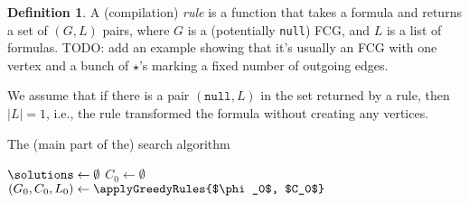 \documentclass{article}
\theoremstyle{definition}
\newtheorem{definition}{Definition}
\theoremstyle{remark}
\begin{document}
\begin{definition}
  A (compilation) \emph{rule} is a function that takes a formula and returns a set of $(G, L)$ pairs, where $G$ is a (potentially \texttt{null}) FCG, and $L$ is a list of formulas. TODO: add an example showing that it's usually an FCG with one vertex and a bunch of $\star$'s marking a fixed number of outgoing edges.
\end{definition}

We assume that if there is a pair $(\texttt{null}, L)$ in the set returned by a rule, then $|L| = 1$, i.e., the rule transformed the formula without creating any vertices.

\begin{algorithm}[t]
  \caption{The (main part of the) search algorithm}
  \label{alg:search}
  $\solutions \gets \emptyset$\;
  $C_0 \gets \emptyset$\;
  $(G_0, C_0, L_0) \gets \applyGreedyRules{$\phi_0$, $C_0$}$\;
\end{algorithm}
\end{document}
